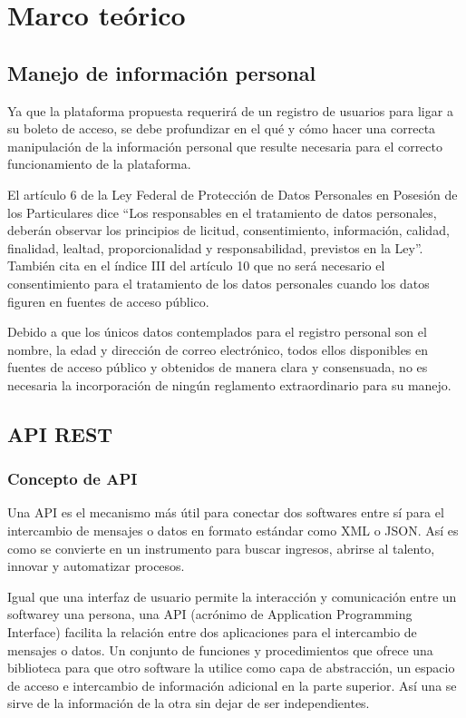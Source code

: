 \section{Marco teórico}

\subsection {Manejo de información personal}

Ya que la plataforma propuesta requerirá de un registro de usuarios para ligar a su boleto de acceso, se debe profundizar en el qué y cómo hacer una correcta manipulación de la información personal que resulte necesaria para el correcto funcionamiento de la plataforma.

El artículo 6 de la Ley Federal de Protección de Datos Personales en Posesión de los Particulares\cite{diarioOficial2010} dice “Los responsables en el tratamiento de datos personales, deberán observar los principios de licitud, consentimiento, información, calidad, finalidad, lealtad, proporcionalidad y responsabilidad, previstos en la Ley”. También cita en el índice III del artículo 10 que no será necesario el consentimiento para el tratamiento de los datos personales cuando los datos figuren en fuentes de acceso público.

Debido a que los únicos datos contemplados para el registro personal son el nombre, la edad y dirección de correo electrónico, todos ellos disponibles en fuentes de acceso público y obtenidos de manera clara y consensuada, no es necesaria la incorporación de ningún reglamento extraordinario para su manejo.

\subsection{API REST}

\subsubsection*{Concepto de API}

Una API es el mecanismo más útil para conectar dos softwares entre sí para el intercambio de mensajes o datos en formato estándar como XML o JSON. Así es como se convierte en un instrumento para buscar ingresos, abrirse al talento, innovar y automatizar procesos\cite{bancomer2016}.

Igual que una interfaz de usuario permite la interacción y comunicación entre un softwarey una persona, una API (acrónimo de Application Programming Interface) facilita la relación entre dos aplicaciones para el intercambio de mensajes o datos. Un conjunto de funciones y procedimientos que ofrece una biblioteca para que otro software la utilice como capa de abstracción, un espacio de acceso e intercambio de información adicional en la parte superior. Así una se sirve de la información de la otra sin dejar de ser independientes.

